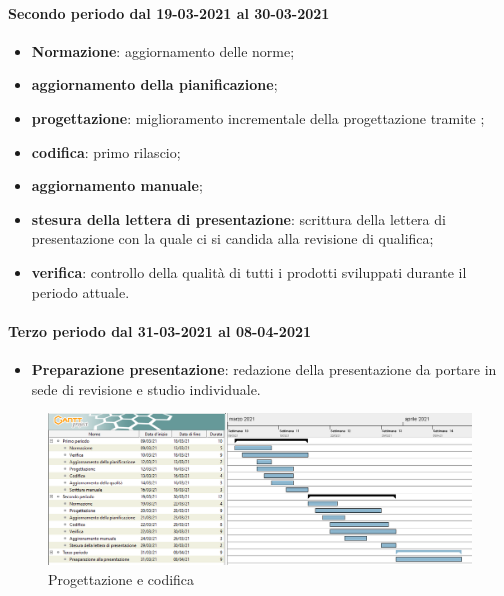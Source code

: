 	\paragraph{Secondo periodo dal 19-03-2021 al 30-03-2021}
	\begin{itemize}
	\item \textbf{Normazione}: aggiornamento delle norme;
	\item \textbf{aggiornamento della pianificazione};
	\item \textbf{progettazione}: miglioramento incrementale della progettazione tramite ;
	\item \textbf{codifica}: primo rilascio;
	\item \textbf{aggiornamento manuale};
	\item \textbf{stesura della lettera di presentazione}: scrittura della lettera di presentazione con la quale ci
	si candida alla revisione di qualifica;
	\item \textbf{verifica}: controllo della qualità di tutti i prodotti sviluppati durante il periodo attuale.
	\end{itemize}

	\paragraph{Terzo periodo dal 31-03-2021 al 08-04-2021}
	\begin{itemize}
	\item \textbf{Preparazione presentazione}: redazione della presentazione da portare in sede di revisione e
	studio individuale.
	\end{itemize}

	\newpage
	
	\begin{landscape}
	\begin{figure}[h!]
		\includegraphics[width=24cm]{images/4_Progettazione_e_codifica.png}
		\caption{Progettazione e codifica}
	\end{figure}
	\end{landscape}

